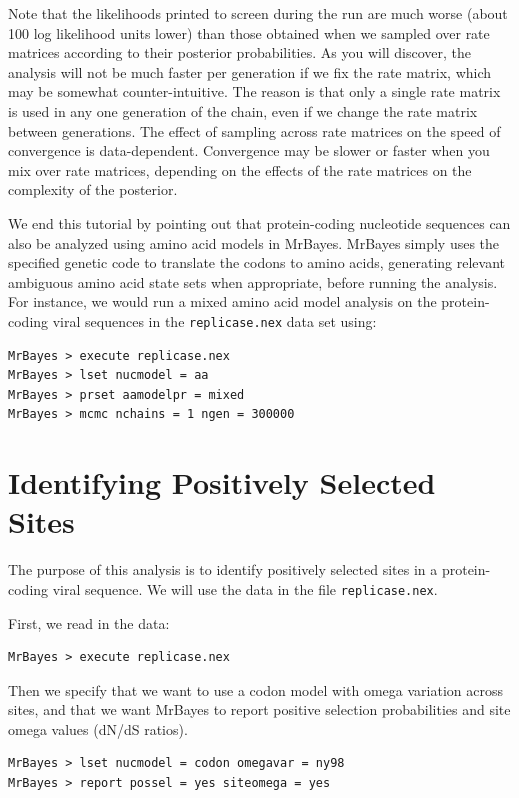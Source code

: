 \documentclass[12pt]{book}
\newcommand{\ttt}[1]{\texttt{#1} }
\begin{document}
Note that the likelihoods printed to screen during the run are much worse (about 100 log likelihood units lower)
than those obtained when we sampled over rate matrices according to their posterior probabilities.
As you will discover, the analysis will not be much faster per generation if we fix the rate matrix, which may be
somewhat counter-intuitive. The reason is that only a single rate matrix is used in any one generation of the
chain, even if we change the rate matrix between generations. The effect of sampling across
rate matrices on the speed of convergence is data-dependent. Convergence may be slower or faster when
you mix over rate matrices, depending on the effects of the rate matrices on the complexity of the posterior.

We end this tutorial by pointing out that protein-coding nucleotide sequences can also be analyzed using
amino acid models in MrBayes. MrBayes simply uses the specified genetic code to translate the codons to amino acids,
generating relevant ambiguous amino acid state sets when appropriate, before running the analysis. For instance,
we would run a mixed amino acid model analysis on the protein-coding viral sequences in the \ttt{replicase.nex}
data set using:

\begin{singlespacing}
\begin{verbatim}
MrBayes > execute replicase.nex
MrBayes > lset nucmodel = aa
MrBayes > prset aamodelpr = mixed
MrBayes > mcmc nchains = 1 ngen = 300000
\end{verbatim}
\end{singlespacing}

\section{Identifying Positively Selected Sites}
The purpose of this analysis is to identify positively selected sites in a protein-coding viral sequence.
We will use the data in the file \texttt{replicase.nex}.

First, we read in the data:

\begin{verbatim}
MrBayes > execute replicase.nex
\end{verbatim}

Then we specify that we want to use a codon model with omega variation across sites, and that we want MrBayes to report positive selection probabilities and site omega values (dN/dS ratios).

\begin{singlespacing}
\begin{verbatim}
MrBayes > lset nucmodel = codon omegavar = ny98
MrBayes > report possel = yes siteomega = yes
\end{verbatim}
\end{singlespacing}
\end{document}

